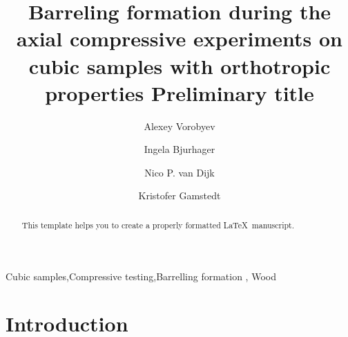 \documentclass[review]{elsarticle}
\begin{document}
\begin{frontmatter}

\title{Barreling formation during the axial compressive experiments on cubic
samples with orthotropic properties {\color{red} Preliminary title}}







\author{Alexey Vorobyev}


\author{Ingela Bjurhager}
\author{Nico P. van Dijk}
\author{Kristofer Gamstedt}

\address{Uppsala University, Division of Appplied Mechanics,
Uppsala, Sweden }



\begin{abstract}
This template helps you to create a properly formatted \LaTeX\ manuscript.
\end{abstract}

\begin{keyword}
Cubic samples\sep Compressive testing\sep Barrelling formation \sep
Wood
\end{keyword}

\end{frontmatter}

\linenumbers

\section{Introduction}
\end{document}
